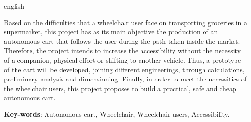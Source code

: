 \begin{resumo}[Abstract]
 \begin{otherlanguage*}{english}
 
 	Based on the difficulties that a wheelchair user face on transporting groceries in a supermarket, this project has as its main objective the production of an autonomous cart that follows the user during the path taken inside the market. Therefore, the project intends to increase the accessibility without the necessity of a companion, physical effort or shifting to another vehicle. Thus, a prototype of the cart will be developed, joining different engineerings, through calculations, preliminary analysis and dimensioning. Finally, in order to meet the necessities of the wheelchair users, this project proposes to build a practical, safe and cheap autonomous cart.

   \vspace{\onelineskip}
 
   \noindent 
   \textbf{Key-words}: Autonomous cart, Wheelchair, Wheelchair users, Accessibility.
 \end{otherlanguage*}
\end{resumo}
